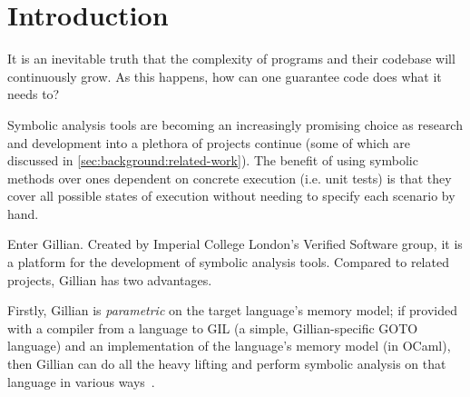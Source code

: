 \chapter{Introduction}
\label{sec:intro}




It is an inevitable truth that the complexity of programs and their codebase
will continuously grow. As this happens, how can one guarantee code does what
it needs to?


Symbolic analysis tools are becoming an increasingly promising choice as
research and development into a plethora of projects continue (some of which
are discussed in \autoref{sec:background:related-work}). The benefit of using
symbolic methods over ones dependent on concrete execution (i.e. unit tests) is
that they cover all possible states of execution without needing to specify each
scenario by hand.


Enter Gillian. Created by Imperial College London's Verified Software group, it
is a platform for the development of symbolic analysis tools. Compared to
related projects, Gillian has two advantages.

Firstly, Gillian is \textit{parametric} on the target language's memory model;
if provided with a compiler from a language to GIL (a simple, Gillian-specific
GOTO language) and an implementation of the language's memory model (in OCaml),
then Gillian can do all the heavy lifting and perform symbolic analysis on that
language in various ways~\cite{gillian-part1}.

